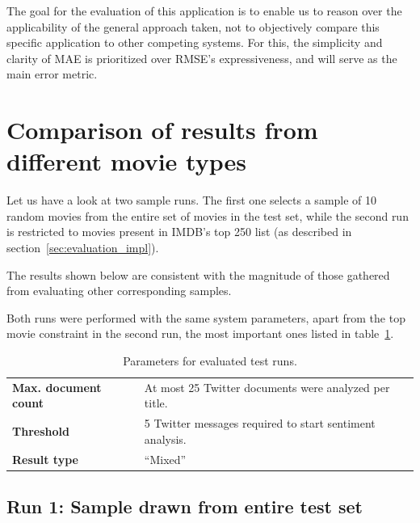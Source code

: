The goal for the evaluation of this application is to enable us to reason over the applicability of the general approach taken, not to objectively compare this specific application to other competing systems. For this, the simplicity and clarity of MAE is prioritized over RMSE's expressiveness, and will serve as the main error metric.

\section{Comparison of results from different movie types} %
\label{sec:comparison_of_results_from_different_movie_types}

Let us have a look at two sample runs. The first one selects a sample of 10 random movies from the entire set of movies in the test set, while the second run is restricted to movies present in IMDB's top 250 list (as described in section~\ref{sec:evaluation_impl}).

The results shown below are consistent with the magnitude of those gathered from evaluating other corresponding samples.

Both runs were performed with the same system parameters, apart from the top movie constraint in the second run, the most important ones listed in table~\ref{tab:run_parameters}.

\begin{table}[h]
  \begin{center}
    \begin{tabular}{ll}
      \textbf{Max. document count} & At most 25 Twitter documents were analyzed per title. \\
      \textbf{Threshold}           & 5 Twitter messages required to start sentiment analysis. \\
      \textbf{Result type}         & ``Mixed'' \\
    \end{tabular}
  \end{center}
  \caption{Parameters for evaluated test runs.}
  \label{tab:run_parameters}
\end{table}

\subsection{Run 1: Sample drawn from entire test set}

